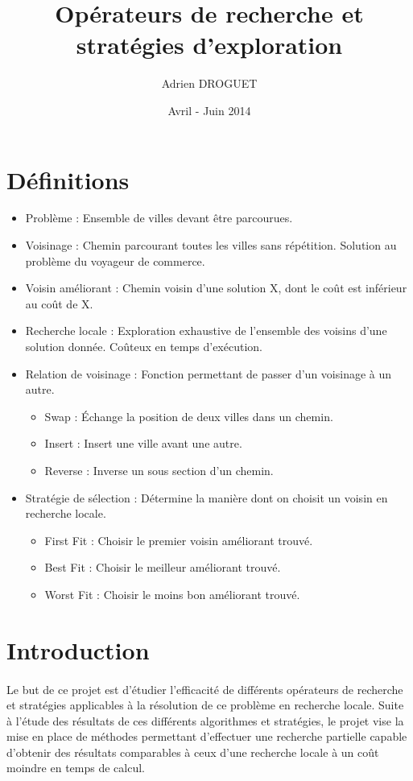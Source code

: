 \documentclass[a4paper,10pt]{report}
\title{Opérateurs de recherche et stratégies d'exploration} %
\author{Adrien DROGUET}
\date{Avril - Juin 2014}
\begin{document}
\maketitle

\tableofcontents
\pagebreak

\section{Définitions}
\begin{itemize}
 \item Problème : Ensemble de villes devant être parcourues.
 \item Voisinage : Chemin parcourant toutes les villes sans répétition. Solution au problème du voyageur de commerce.
 \item Voisin améliorant : Chemin voisin d'une solution X, dont le coût est inférieur au coût de X.
 \item Recherche locale : Exploration exhaustive de l'ensemble des voisins d'une solution donnée.
 Coûteux en temps d'exécution.
 \item Relation de voisinage : Fonction permettant de passer d'un voisinage à un autre.
 \begin{itemize}
  \item Swap : Échange la position de deux villes dans un chemin.
  \item Insert : Insert une ville avant une autre.
  \item Reverse : Inverse un sous section d'un chemin.
 \end{itemize}
 \item Stratégie de sélection : Détermine la manière dont on choisit un voisin en recherche locale.
 \begin{itemize}
  \item First Fit : Choisir le premier voisin améliorant trouvé.
  \item Best Fit : Choisir le meilleur améliorant trouvé.
  \item Worst Fit : Choisir le moins bon améliorant trouvé.
 \end{itemize}
\end{itemize}


\section{Introduction}

\paragraph{} %
  Le but de ce projet est d'étudier l'efficacité de différents opérateurs de recherche et stratégies applicables
à la résolution de ce problème en recherche locale. Suite à l'étude des résultats de ces différents algorithmes
et stratégies, le projet vise la mise en place de méthodes permettant d'effectuer une recherche partielle capable
d'obtenir des résultats comparables à ceux d'une recherche locale à un coût moindre en temps de calcul.
\end{document}
